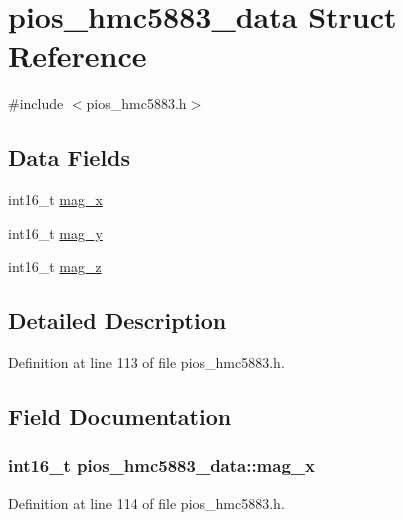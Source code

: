 \hypertarget{structpios__hmc5883__data}{\section{pios\-\_\-hmc5883\-\_\-data \-Struct \-Reference}
\label{structpios__hmc5883__data}
}


{\ttfamily \#include $<$pios\-\_\-hmc5883.\-h$>$}

\subsection*{\-Data \-Fields}
\begin{DoxyCompactItemize}
\item 
int16\-\_\-t \hyperlink{structpios__hmc5883__data_a085be4ca2f59dcffe255094fe12d36f7}{mag\-\_\-x}
\item 
int16\-\_\-t \hyperlink{structpios__hmc5883__data_a707b18d498bd59bdee07421a6010c616}{mag\-\_\-y}
\item 
int16\-\_\-t \hyperlink{structpios__hmc5883__data_a03ffa9851eac28313edf9c6cc0a9cdd0}{mag\-\_\-z}
\end{DoxyCompactItemize}


\subsection{\-Detailed \-Description}


\-Definition at line 113 of file pios\-\_\-hmc5883.\-h.



\subsection{\-Field \-Documentation}
\hypertarget{structpios__hmc5883__data_a085be4ca2f59dcffe255094fe12d36f7}{
\subsubsection[{mag\-\_\-x}]{\setlength{\rightskip}{0pt plus 5cm}int16\-\_\-t {\bf pios\-\_\-hmc5883\-\_\-data\-::mag\-\_\-x}}}\label{structpios__hmc5883__data_a085be4ca2f59dcffe255094fe12d36f7}


\-Definition at line 114 of file pios\-\_\-hmc5883.\-h.

